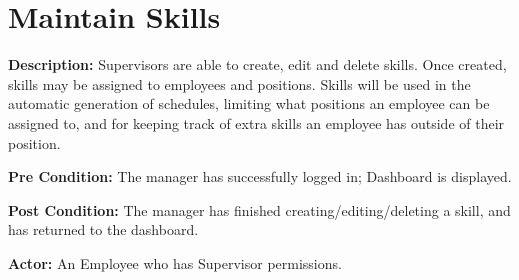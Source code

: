 \documentclass[letterpaper,12pt]{report}
\begin{document}


\pagebreak
\section{Maintain Skills}
\begin{description}
 \item \textbf{Description:} \newline Supervisors are able to create, edit and delete skills.  Once created, skills may be assigned to employees and positions. Skills will be used in the automatic generation of schedules, limiting what positions an employee can be assigned to, and for keeping track of extra skills an employee has outside of their position.
 \item \textbf{Pre Condition:} \newline The manager has successfully logged in; Dashboard is displayed.
 \item \textbf{Post Condition:} \newline The manager has finished creating/editing/deleting a skill, and has returned to the dashboard.
 \item \textbf{Actor:} \newline  An Employee who has Supervisor permissions.
\end{description}
\end{document}
